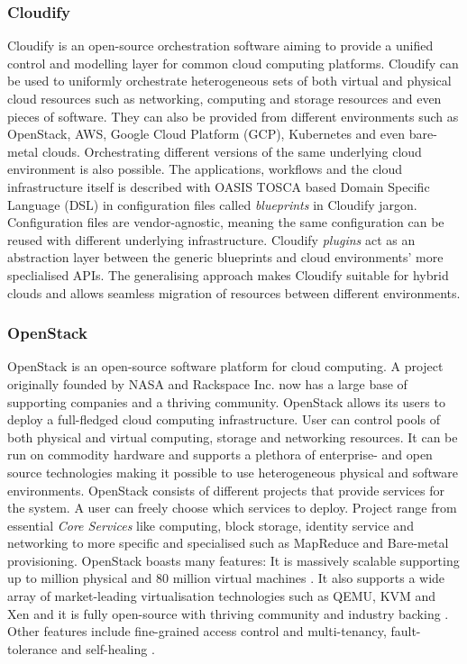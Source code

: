\subsubsection{Cloudify}

Cloudify \cite{cloudify} is an open-source orchestration software aiming to provide a unified control and modelling layer for common cloud computing platforms. Cloudify can be used to uniformly orchestrate heterogeneous sets of both virtual and physical cloud resources such as networking, computing and storage resources and even pieces of software. They can also be provided from different environments such as OpenStack, AWS, Google Cloud Platform (GCP), Kubernetes and even bare-metal clouds. Orchestrating different versions of the same underlying cloud environment is also possible. The applications, workflows and the cloud infrastructure itself is described with OASIS TOSCA \cite{Tosca} based Domain Specific Language (DSL) in configuration files called \textit{blueprints} in Cloudify jargon. Configuration files are vendor-agnostic, meaning the same configuration can be reused with different underlying infrastructure. Cloudify \textit{plugins} act as an abstraction layer between the generic blueprints and cloud environments' more speclialised APIs. The generalising approach makes Cloudify suitable for hybrid clouds and allows seamless migration of resources between different environments.

\subsubsection{OpenStack}

OpenStack \cite{openstackproject} is an open-source software platform for cloud computing. A project originally founded by NASA and Rackspace Inc. now has a large base of supporting companies  \cite{openstackpartners} and a thriving community.
	OpenStack allows its users to deploy a full-fledged cloud computing infrastructure. User can control pools of both physical and virtual computing, storage and networking resources. It can be run on commodity hardware and supports a plethora of enterprise- and open source technologies making it possible to use heterogeneous physical and software environments.
	OpenStack consists of different projects that provide services for the system. A user can freely choose which services to deploy. Project range from essential \textit{Core Services} like computing, block storage, identity service and networking to more specific and specialised such as MapReduce and Bare-metal provisioning\cite{openstackproject}. OpenStack boasts many features: It is massively scalable supporting up to million physical and 80 million virtual machines \cite{openstack}. It also supports a wide array of market-leading virtualisation technologies such as QEMU, KVM and Xen and it is fully open-source with thriving community and industry backing \cite{openstackpartners}. Other features include fine-grained access control and multi-tenancy, fault-tolerance and self-healing \cite{openstackfeatures}.

